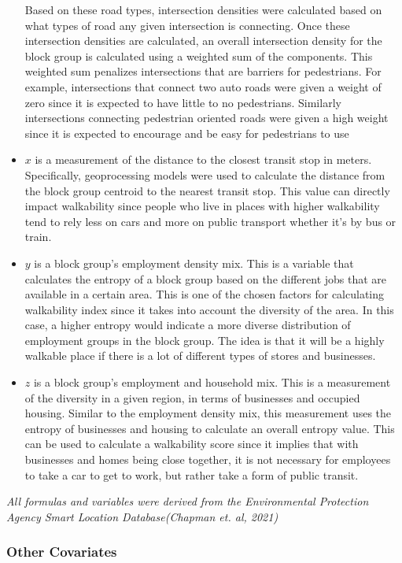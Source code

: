 \documentclass[
]{article}
\begin{document}
\begin{itemize}
  Based on these road types, intersection densities were calculated
  based on what types of road any given intersection is connecting. Once
  these intersection densities are calculated, an overall intersection
  density for the block group is calculated using a weighted sum of the
  components. This weighted sum penalizes intersections that are
  barriers for pedestrians. For example, intersections that connect two
  auto roads were given a weight of zero since it is expected to have
  little to no pedestrians. Similarly intersections connecting
  pedestrian oriented roads were given a high weight since it is
  expected to encourage and be easy for pedestrians to use
\item
  \(x\) is a measurement of the distance to the closest transit stop in
  meters. Specifically, geoprocessing models were used to calculate the
  distance from the block group centroid to the nearest transit stop.
  This value can directly impact walkability since people who live in
  places with higher walkability tend to rely less on cars and more on
  public transport whether it's by bus or train.
\item
  \(y\) is a block group's employment density mix. This is a variable
  that calculates the entropy of a block group based on the different
  jobs that are available in a certain area. This is one of the chosen
  factors for calculating walkability index since it takes into account
  the diversity of the area. In this case, a higher entropy would
  indicate a more diverse distribution of employment groups in the block
  group. The idea is that it will be a highly walkable place if there is
  a lot of different types of stores and businesses.
\item
  \(z\) is a block group's employment and household mix. This is a
  measurement of the diversity in a given region, in terms of businesses
  and occupied housing. Similar to the employment density mix, this
  measurement uses the entropy of businesses and housing to calculate an
  overall entropy value. This can be used to calculate a walkability
  score since it implies that with businesses and homes being close
  together, it is not necessary for employees to take a car to get to
  work, but rather take a form of public transit.
\end{itemize}

\emph{All formulas and variables were derived from the Environmental
Protection Agency Smart Location Database(Chapman et. al, 2021)}

\subsubsection{Other Covariates}\label{other-covariates}
\end{document}
